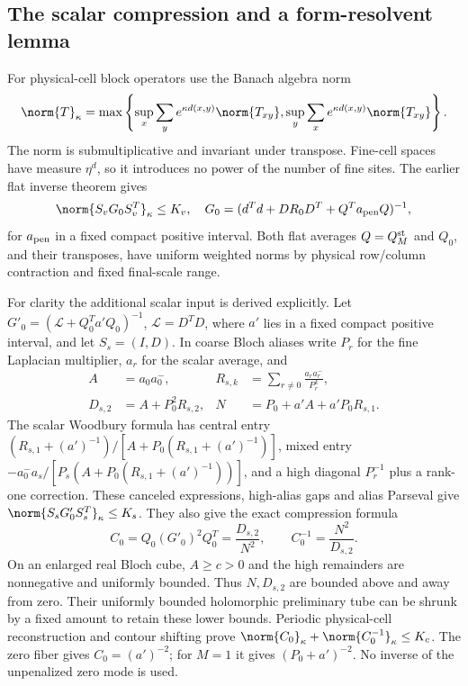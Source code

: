 \subsection{The scalar compression and a form-resolvent lemma}
\label{nw-scalar}

For physical-cell block operators use the Banach algebra norm
\begin{equation}\label{nw-schur}
 \norm{T}_\kappa=\max\left\{
 \sup_x\sum_y e^{\kappa d(x,y)}\norm{T_{xy}},
 \sup_y\sum_x e^{\kappa d(x,y)}\norm{T_{xy}}\right\}.
\end{equation}
The norm is submultiplicative and invariant under transpose.
Fine-cell spaces have measure $\eta^d$, so it introduces no power
of the number of fine sites. The earlier flat inverse theorem gives
\begin{equation}\label{nw-flat-blocks}
 \norm{S_vG_0S_v^T}_\kappa\le K_v,
 \quad G_0=(d^Td+DR_0D^T+Q^Ta_{\rm pen}Q)^{-1},
\end{equation}
for $a_{\rm pen}$ in a fixed compact positive interval.
Both flat averages $Q=Q_M^{\rm st}$ and $Q_0$, and their transposes,
have uniform weighted norms by physical row/column contraction and
fixed final-scale range.

For clarity the additional scalar input is derived explicitly.
Let $G'_0=(\mathcal L+Q_0^Ta'Q_0)^{-1}$, $\mathcal L=D^TD$,
where $a'$ lies in a fixed compact positive interval, and let
$S_s=(I,D)$. In coarse Bloch aliases write $P_r$ for the fine
Laplacian multiplier, $a_r$ for the scalar average, and
\begin{align}
 A&=a_0a_0^-,&
 R_{s,k}&=\sum_{r\ne0}\frac{a_ra_r^-}{P_r^k},\nonumber\\
 D_{s,2}&=A+P_0^2R_{s,2},&
 N&=P_0+a'A+a'P_0R_{s,1}.                   \label{nw-scalar-denoms}
\end{align}
The scalar Woodbury formula has central entry
$(R_{s,1}+(a')^{-1})/[A+P_0(R_{s,1}+(a')^{-1})]$,
mixed entry $-a_0^-a_s/[P_s(A+P_0(R_{s,1}+(a')^{-1}))]$,
and a high diagonal $P_r^{-1}$ plus a rank-one correction.
These canceled expressions, high-alias gaps and alias Parseval
give $\norm{S_sG'_0S_s^T}_\kappa\le K_s$.
They also give the exact compression formula
\begin{equation}\label{nw-compression}
 C_0=Q_0(G'_0)^2Q_0^T=\frac{D_{s,2}}{N^2},
 \qquad C_0^{-1}=\frac{N^2}{D_{s,2}}.
\end{equation}
On an enlarged real Bloch cube, $A\ge c>0$ and the high remainders
are nonnegative and uniformly bounded. Thus $N,D_{s,2}$ are
bounded above and away from zero. Their uniformly bounded
holomorphic preliminary tube can be shrunk by a fixed amount to
retain these lower bounds. Periodic physical-cell reconstruction
and contour shifting prove
$\norm{C_0}_\kappa+\norm{C_0^{-1}}_\kappa\le K_c$.
The zero fiber gives $C_0=(a')^{-2}$; for $M=1$ it gives
$(P_0+a')^{-2}$. No inverse of the unpenalized zero mode is used.

